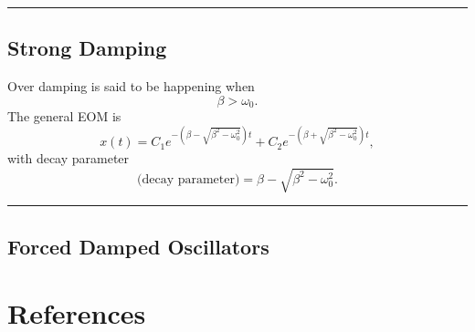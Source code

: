 \documentclass[12pt,english]{article}
\numberwithin{equation}{subsection}
\begin{document}
\par\noindent\rule{\textwidth}{0.4pt}
\subsection{Strong Damping}
Over damping is said to be happening when
\begin{equation*}
    \beta > \omega_0.
\end{equation*}
The general EOM is
\begin{equation}
    x(t) = C_1 e^{-\left(\beta - \sqrt{\beta^2 - \omega_0^2}\right)t} + C_2 e^{-\left(\beta + \sqrt{\beta^2 - \omega_0^2}\right)t},
\end{equation}
with decay parameter
\begin{equation*}
    \text{(decay parameter)} = \beta - \sqrt{\beta^2 - \omega_0^2}.
\end{equation*}

\par\noindent\rule{\textwidth}{0.4pt}
\subsection{Forced Damped Oscillators}























\newpage
\section*{References}
\printbibliography[heading = none]
\end{document}
